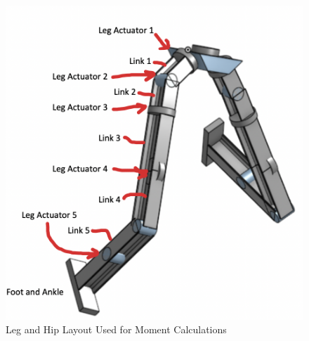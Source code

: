 \documentclass{article}
\begin{document}
\begin{figure}[H]
    \centering
    \includegraphics[scale=1]{assets/Design Presentation/Leg Layout Moments.png}
    \caption{Leg and Hip Layout \n Used for Moment Calculations}
    \label{fig:enter-label}
\end{figure}
\end{document}

